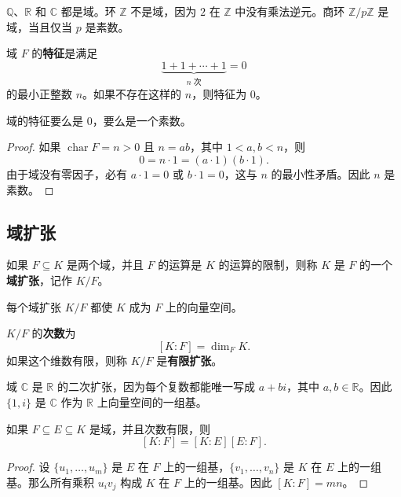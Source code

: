 \begin{example}
$\mathbb{Q}$、$\mathbb{R}$ 和 $\mathbb{C}$ 都是域。环 $\mathbb{Z}$ 不是域，因为 $2$ 在 $\mathbb{Z}$ 中没有乘法逆元。商环 $\mathbb{Z}/p\mathbb{Z}$ 是域，当且仅当 $p$ 是素数。
\end{example}

\begin{definition}[特征]
域 $F$ 的\textbf{特征}是满足
\[
    \underbrace{1+1+\cdots+1}_{n\text{ 次}}=0
\]
的最小正整数 $n$。如果不存在这样的 $n$，则特征为 $0$。
\end{definition}

\begin{proposition}
域的特征要么是 $0$，要么是一个素数。
\end{proposition}

\begin{proof}
如果 $\operatorname{char}F=n>0$ 且 $n=ab$，其中 $1<a,b<n$，则
\[
    0=n\cdot 1=(a\cdot 1)(b\cdot 1).
\]
由于域没有零因子，必有 $a\cdot 1=0$ 或 $b\cdot 1=0$，这与 $n$ 的最小性矛盾。因此 $n$ 是素数。
\end{proof}

\subsection{域扩张}

\begin{definition}[域扩张]
如果 $F\subseteq K$ 是两个域，并且 $F$ 的运算是 $K$ 的运算的限制，则称 $K$ 是 $F$ 的一个\textbf{域扩张}，记作 $K/F$。
\end{definition}

每个域扩张 $K/F$ 都使 $K$ 成为 $F$ 上的向量空间。

\begin{definition}[扩张次数]
$K/F$ 的\textbf{次数}为
\[
    [K:F]=\dim_F K.
\]
如果这个维数有限，则称 $K/F$ 是\textbf{有限扩张}。
\end{definition}

\begin{example}
域 $\mathbb{C}$ 是 $\mathbb{R}$ 的二次扩张，因为每个复数都能唯一写成 $a+bi$，其中 $a,b\in\mathbb{R}$。因此 $\{1,i\}$ 是 $\mathbb{C}$ 作为 $\mathbb{R}$ 上向量空间的一组基。
\end{example}

\begin{theorem}[塔式定律]
如果 $F\subseteq E\subseteq K$ 是域，并且次数有限，则
\[
    [K:F]=[K:E][E:F].
\]
\end{theorem}

\begin{proof}
设 $\{u_1,\dots,u_m\}$ 是 $E$ 在 $F$ 上的一组基，$\{v_1,\dots,v_n\}$ 是 $K$ 在 $E$ 上的一组基。那么所有乘积 $u_i v_j$ 构成 $K$ 在 $F$ 上的一组基。因此 $[K:F]=mn$。
\end{proof}

